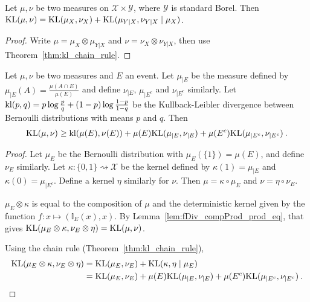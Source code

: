 \begin{theorem}
  \label{thm:kl_chain_rule_prod}
  Let $\mu, \nu$ be two measures on $\mathcal X \times \mathcal Y$, where $\mathcal Y$ is standard Borel.
  Then $\mathrm{KL}(\mu, \nu) = \mathrm{KL}(\mu_X, \nu_X) + \mathrm{KL}(\mu_{Y|X}, \nu_{Y|X} \mid \mu_X)$.
\end{theorem}

\begin{proof}
Write $\mu = \mu_X \otimes \mu_{Y|X}$ and $\nu = \nu_X \otimes \nu_{Y|X}$, then use Theorem~\ref{thm:kl_chain_rule}.
\end{proof}

\begin{lemma}
  \label{lem:kl_chain_rule_cond_event}
  Let $\mu, \nu$ be two measures and $E$ an event. Let $\mu_{|E}$ be the measure defined by $\mu_{|E}(A) = \frac{\mu(A \cap E)}{\mu(E)}$ and define $\nu_{|E}$, $\mu_{| E^c}$ and $\nu_{| E^c}$ similarly. Let $\mathrm{kl}(p,q) = p\log\frac{p}{q} + (1-p)\log\frac{1-p}{1-q}$ be the Kullback-Leibler divergence between Bernoulli distributions with means $p$ and $q$. Then
  \begin{align*}
  \mathrm{KL}(\mu, \nu) \ge \mathrm{kl}(\mu(E), \nu(E)) + \mu(E) \mathrm{KL}(\mu_{|E}, \nu_{|E}) + \mu(E^c) \mathrm{KL}(\mu_{|E^c}, \nu_{|E^c}) \: .
  \end{align*}
\end{lemma}

\begin{proof}
Let $\mu_E$ be the Bernoulli distribution with $\mu_E(\{1\}) = \mu(E)$, and define $\nu_E$ similarly.
Let $\kappa : \{0,1\} \rightsquigarrow \mathcal X$ be the kernel defined by $\kappa(1) = \mu_{|E}$ and $\kappa(0) = \mu_{|E^c}$. Define a kernel $\eta$ similarly for $\nu$.
Then $\mu = \kappa \circ \mu_E$ and $\nu = \eta \circ \nu_E$.

$\mu_E \otimes \kappa$ is equal to the composition of $\mu$ and the deterministic kernel given by the function $f : x \mapsto (\mathbb{I}_E(x), x)$. By Lemma~\ref{lem:fDiv_compProd_prod_eq}, that gives $\mathrm{KL}(\mu_E \otimes \kappa, \nu_E \otimes \eta) = \mathrm{KL}(\mu, \nu)$.

Using the chain rule (Theorem~\ref{thm:kl_chain_rule}),
\begin{align*}
\mathrm{KL}(\mu_E \otimes \kappa, \nu_E \otimes \eta)
&= \mathrm{KL}(\mu_E, \nu_E) + \mathrm{KL}(\kappa, \eta \mid \mu_E)
\\
&= \mathrm{KL}(\mu_E, \nu_E) + \mu(E) \mathrm{KL}(\mu_{|E}, \nu_{|E}) + \mu(E^c) \mathrm{KL}(\mu_{|E^c}, \nu_{|E^c})
\: .
\end{align*}

\end{proof}

